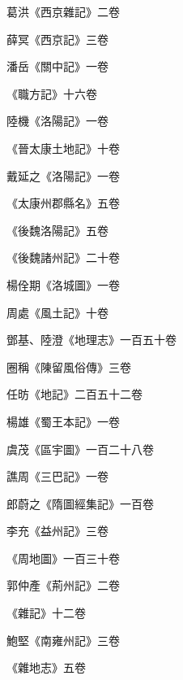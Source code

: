 \begin{pinyinscope}
 葛洪《西京雜記》二卷



 薛冥《西京記》三卷



 潘岳《關中記》一卷



 《職方記》十六卷



 陸機《洛陽記》一卷



 《晉太康土地記》十卷



 戴延之《洛陽記》一卷



 《太康州郡縣名》五卷



 《後魏洛陽記》五卷



 《後魏諸州記》二十卷



 楊佺期《洛城圖》一卷



 周處《風土記》十卷



 鄧基、陸澄《地理志》一百五十卷



 圈稱《陳留風俗傳》三卷



 任昉《地記》二百五十二卷



 楊雄《蜀王本記》一卷



 虞茂《區宇圖》一百二十八卷



 譙周《三巴記》一卷



 郎蔚之《隋圖經集記》一百卷



 李充《益州記》三卷



 《周地圖》一百三十卷



 郭仲產《荊州記》二卷



 《雜記》十二卷



 鮑堅《南雍州記》三卷



 《雜地志》五卷




\end{pinyinscope}
